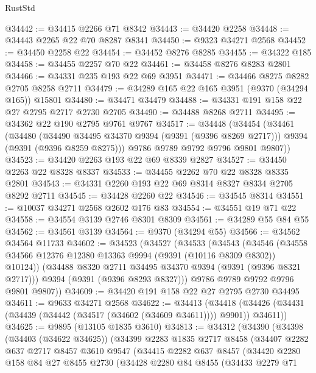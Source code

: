 \begin{lexlean}{RustStd}
\begin{coremodule}
@34442 := @34415 @2266 @71 @8342
@34443 := @34420 @2258
@34448 := @34443 @2265 @22 @70 @8287 @8341
@34450 := @9323 @34271 @2568
@34452 := @34450 @2258 @22
@34454 := @34452 @8276 @8285
@34455 := @34322 @185
@34458 := @34455 @2257 @70 @22
@34461 := @34458 @8276 @8283 @2801
@34466 := @34331 @235 @193 @22 @69 @3951
@34471 := @34466 @8275 @8282 @2705 @8258 @2711
@34479 := @34289 @165 @22 @165 @3951 (@9370 (@34294 @165)) @15801
@34480 := @34471 @34479
@34488 := @34331 @191 @158 @22 @27 @2795 @2717 @2730 @2705
@34490 := @34488 @8268 @2711
@34495 := @34362 @22 @190 @2795 @9761 @9767
@34517 := @34448
    (@34454
      (@34461
        (@34480
          (@34490 @34495 @34370 @9394 (@9391 (@9396 @8269 @2717)))
          @9394
          (@9391 (@9396 @8259 @8275)))
        @9786
        @9789
        @9792
        @9796
        @9801
        @9807))
@34523 := @34420 @2263 @193 @22 @69 @8339 @2827
@34527 := @34450 @2263 @22 @8328 @8337
@34533 := @34455 @2262 @70 @22 @8328 @8335 @2801
@34543 := @34331 @2260 @193 @22 @69 @8314 @8327 @8334 @2705 @8292 @2711
@34545 := @34428 @2260 @22
@34546 := @34545 @8314
@34551 := @10037 @34271 @2568 @2602 @176 @83
@34554 := @34551 @19 @71 @22
@34558 := @34554 @3139 @2746 @8301 @8309
@34561 := @34289 @55 @84 @55
@34562 := @34561 @3139
@34564 := @9370 (@34294 @55)
@34566 := @34562 @34564 @11733
@34602 := @34523
    (@34527
      (@34533
        (@34543
          (@34546 (@34558 @34566 @12376 @12380 @13363 @9994 (@9391 (@10116 @8309 @8302)) @10124))
          (@34488 @8320 @2711 @34495 @34370 @9394 (@9391 (@9396 @8321 @2717)))
          @9394
          (@9391 (@9396 @8293 @8327)))
        @9786
        @9789
        @9792
        @9796
        @9801
        @9807))
@34609 := @34420 @191 @158 @22 @27 @2795 @2730 @34495
@34611 := @9633 @34271 @2568
@34622 := @34413
    (@34418 (@34426 (@34431 (@34439 (@34442 (@34517 (@34602 (@34609 @34611)))) @9901)) @34611))
@34625 := @9895 (@13105 @1835 @3610)
@34813 := @34312
    (@34390
      (@34398
        (@34403 (@34622 @34625))
        (@34399
          @2283
          @1835
          @2717
          @8458
          (@34407
            @2282
            @637
            @2717
            @8457
            @3610
            @9547
            (@34415
              @2282
              @637
              @8457
              (@34420
                @2280
                @158
                @84
                @27
                @8455
                @2730
                (@34428
                  @2280
                  @84
                  @8455
                  (@34433
                    @2279
                    @71

\end{coremodule}
\end{lexlean}
